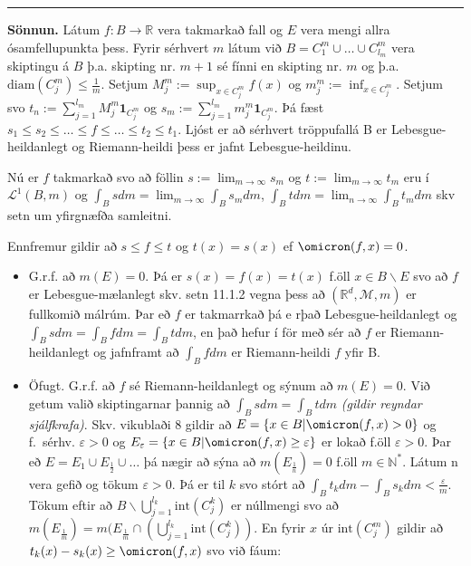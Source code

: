 \documentclass[]{book}
\begin{document}
\begin{center}\rule{0.5\linewidth}{\linethickness}\end{center}

\textbf{Sönnun.} Látum \(f: B\rightarrow \mathbb R\) vera takmarkað fall og \(E\) vera mengi allra ósamfellupunkta þess. Fyrir sérhvert \(m\) látum við \(B = C_1^m\cup\dots\cup C_{l_m}^m\) vera skiptingu á \(B\) þ.a. skipting nr. \(m+1\) sé fínni en skipting nr. \(m\) og þ.a. \(\text{diam}(C_j^m)\leq\frac1m\). Setjum \(M_j^m:=\sup_{x\in C_j^m}f(x)\) og \(m_j^m:= \inf_{x\in C_j^m}\). Setjum svo \(t_n:= \sum_{j=1}^{l_m}M_j^m\mathbf1_{C_j^m}\) og \(s_m := \sum_{j=1}^{l_m}m_j^m\mathbf1_{C_j^m}\). Þá fæst \(s_1\leq s_2\leq \dots\leq f \leq \dots \leq t_2 \leq t_1\). Ljóst er að sérhvert tröppufallá B er Lebesgue-heildanlegt og Riemann-heildi þess er jafnt Lebesgue-heildinu.

Nú er \(f\) takmarkað svo að föllin \(s:=\lim_{m\rightarrow\infty} s_m\) og \(t:=\lim_{m\rightarrow\infty}t_m\) eru í \(\mathcal L^1(B,m)\) og \(\int_B sdm = \lim_{m\rightarrow\infty}\int_B s_mdm\), \(\int_Btdm = \lim_{n\rightarrow\infty}\int_B t_mdm\) skv setn um yfirgnæfða samleitni.

Ennfremur gildir að \(s\leq f\leq t\) og \(t(x) = s(x)\) ef \(\omicron(f,x)=0\).

\begin{itemize}
\item
  G.r.f. að \(m(E) = 0\). Þá er \(s(x) = f(x) =t(x)\) f.öll \(x\in B\backslash E\) svo að \(f\) er Lebesgue-mælanlegt skv. setn 11.1.2 vegna þess að \((\mathbb R^d, \mathcal M, m)\) er fullkomið málrúm. Þar eð \(f\) er takmarrkað þá e rþað Lebesgue-heildanlegt og \(\int_B sdm = \int_B fdm = \int_B tdm\), en það hefur í för með sér að \(f\) er Riemann-heildanlegt og jafnframt að \(\int_B fdm\) er Riemann-heildi \(f\) yfir B.
\item
  Öfugt. G.r.f. að \(f\) sé Riemann-heildanlegt og sýnum að \(m(E) = 0\). Við getum valið skiptingarnar þannig að \(\int_B sdm = \int_B tdm\) \emph{(gildir reyndar sjálfkrafa)}. Skv. vikublaði 8 gildir að \(E = \{x\in B | \omicron(f,x)>0\}\) og f.~sérhv. \(\varepsilon>0\) og \(E_\varepsilon = \{x\in B | \omicron(f,x)\geq \varepsilon\}\) er lokað f.öll \(\varepsilon > 0\). Þar eð \(E = E_1\cup E_{\frac12} \cup\dots\) þá nægir að sýna að \(m(E_{\frac1n}) = 0\) f.öll \(m\in\mathbb N^*\). Látum n vera gefið og tökum \(\varepsilon > 0\). Þá er til \(k\) svo stórt að \(\int_B t_kdm - \int_B s_kdm < \frac\varepsilon m\). Tökum eftir að \(B\backslash\bigcup_{j=1}^{l_k}\text{int}(C_j^k)\) er núllmengi svo að \(m(E_{\frac1m}) = m(E_{\frac1m}\cap(\bigcup_{j=1}^{l_k}\text{int}(C_j^k))\). En fyrir \(x\) úr \(\text{int}(C_j^m)\) gildir að \(t_k(x) - s_k(x) \geq \omicron(f,x)\) svo við fáum:
\end{itemize}
\end{document}
